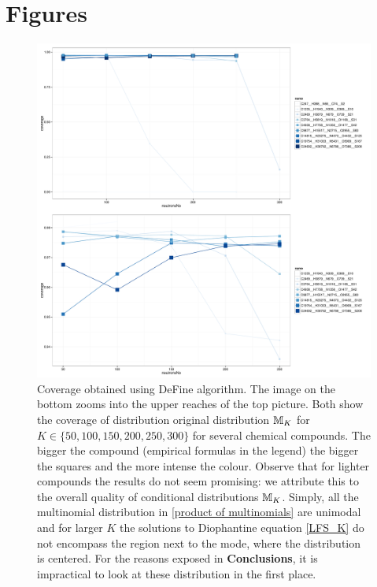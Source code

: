 \section*{Figures}


\begin{figure}[htbp]
 \centering
 \includegraphics[width=.8\textwidth]{./img/DeFineCoverage}
 \caption{Coverage obtained using {\sc DeFine} algorithm. The image on the bottom zooms into the upper reaches of the top picture. Both show the coverage of distribution original distribution $\mathbb{M}_K$ for $K \in \{50, 100, 150, 200, 250, 300 \}$ for several chemical compounds. The bigger the compound (empirical formulas in the legend) the bigger the squares and the more intense the colour. Observe that for lighter compounds the results do not seem promising: we attribute this to the overall quality of conditional distributions $\mathbb{M}_K$. Simply, all the multinomial distribution in \eqref{product of multinomials} are unimodal and for larger $K$ the solutions to Diophantine equation \eqref{LFS_K} do not encompass the region next to the mode, where the distribution is centered. For the reasons exposed in \textbf{Conclusions}, it is impractical to look at these distribution in the first place.}
 \label{figure: Coverage}
\end{figure}

